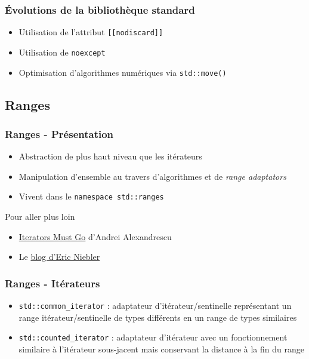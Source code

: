 \documentclass[C++.tex]{subfiles}
\begin{document}
\begin{frame}[fragile]
	\frametitle{Évolutions de la bibliothèque standard}
	\begin{itemize}
		\item Utilisation de l'attribut \lstinline|[[nodiscard]]|
		\item Utilisation de \lstinline|noexcept|
		\item Optimisation d'algorithmes numériques via \lstinline|std::move()|

	\end{itemize}
\end{frame}

\subsection*{Ranges}
\begin{frame}
	\frametitle{Ranges - Présentation}
	\begin{itemize}
		\item Abstraction de plus haut niveau que les itérateurs
		\item Manipulation d'ensemble au travers d'algorithmes et de \textit{range adaptators}
		\item Vivent dans le \lstinline|namespace std::ranges|

	\end{itemize}

	\begin{block}{Pour aller plus loin}
		\begin{itemize}
			\item \href{https://accu.org/content/conf2009/AndreiAlexandrescu_iterators-must-go.pdf}{\og Iterators Must Go\fg{}} d'Andrei Alexandrescu


			\item Le \href{http://ericniebler.com/}{blog d'Eric Niebler}
		\end{itemize}
	\end{block}
\end{frame}

\begin{frame}[fragile]
	\frametitle{Ranges - Itérateurs}
	\begin{itemize}
		\item \lstinline|std::common_iterator| : adaptateur d'itérateur/sentinelle représentant un range itérateur/sentinelle de types différents en un range de types similaires


		\item \lstinline|std::counted_iterator| : adaptateur d'itérateur avec un fonctionnement similaire à l'itérateur sous-jacent mais conservant la distance à la fin du range
	\end{itemize}
\end{frame}
\end{document}
